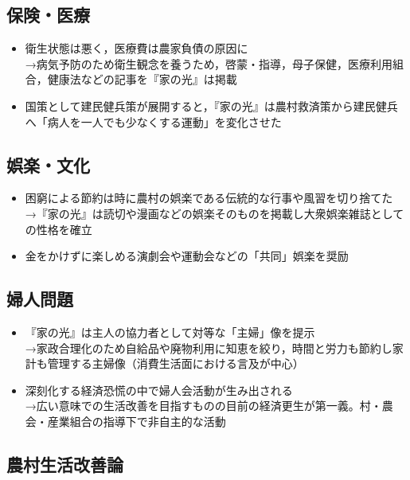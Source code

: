 \documentclass[11pt,autodetect-engine]{jsarticle}%
\begin{document}
 \subsection{保険・医療 }
 
 \begin{itemize}
  \item 衛生状態は悪く，医療費は農家負債の原因に
  \\→病気予防のため衛生観念を養うため，啓蒙・指導，母子保健，医療利用組合，健康法などの記事を『家の光』は掲載
  \item 国策として建民健兵策が展開すると，『家の光』は農村救済策から建民健兵へ「病人を一人でも少なくする運動」を変化させた
\end{itemize}

 \subsection{娯楽・文化 }
 
 \begin{itemize}
  \item 困窮による節約は時に農村の娯楽である伝統的な行事や風習を切り捨てた
  \\→『家の光』は読切や漫画などの娯楽そのものを掲載し大衆娯楽雑誌としての性格を確立
  \item 金をかけずに楽しめる演劇会や運動会などの「共同」娯楽を奨励
\end{itemize}

 \subsection{婦人問題 }
 
 \begin{itemize}
  \item 『家の光』は主人の協力者として対等な「主婦」像を提示
  \\→家政合理化のため自給品や廃物利用に知恵を絞り，時間と労力も節約し家計も管理する主婦像（消費生活面における言及が中心）
  \item 深刻化する経済恐慌の中で婦人会活動が生み出される
  \\→広い意味での生活改善を目指すものの目前の経済更生が第一義。村・農会・産業組合の指導下で非自主的な活動
\end{itemize}

 \subsection{農村生活改善論 }
 
\end{document}
